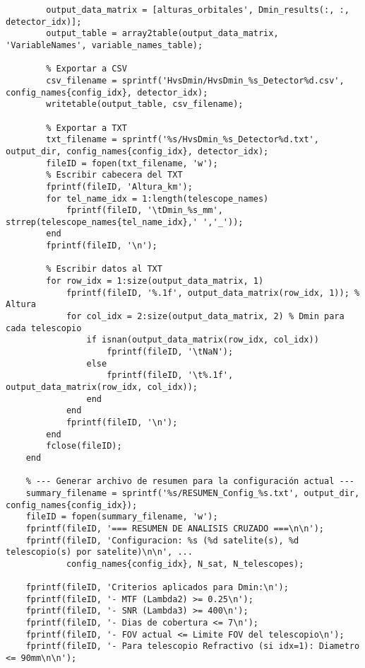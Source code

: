 \begin{verbatim}
        output_data_matrix = [alturas_orbitales', Dmin_results(:, :, detector_idx)];
        output_table = array2table(output_data_matrix, 'VariableNames', variable_names_table);

        % Exportar a CSV
        csv_filename = sprintf('HvsDmin/HvsDmin_%s_Detector%d.csv', config_names{config_idx}, detector_idx);
        writetable(output_table, csv_filename);

        % Exportar a TXT
        txt_filename = sprintf('%s/HvsDmin_%s_Detector%d.txt', output_dir, config_names{config_idx}, detector_idx);
        fileID = fopen(txt_filename, 'w');
        % Escribir cabecera del TXT
        fprintf(fileID, 'Altura_km');
        for tel_name_idx = 1:length(telescope_names)
            fprintf(fileID, '\tDmin_%s_mm', strrep(telescope_names{tel_name_idx},' ','_'));
        end
        fprintf(fileID, '\n');
        
        % Escribir datos al TXT
        for row_idx = 1:size(output_data_matrix, 1)
            fprintf(fileID, '%.1f', output_data_matrix(row_idx, 1)); % Altura
            for col_idx = 2:size(output_data_matrix, 2) % Dmin para cada telescopio
                if isnan(output_data_matrix(row_idx, col_idx))
                    fprintf(fileID, '\tNaN');
                else
                    fprintf(fileID, '\t%.1f', output_data_matrix(row_idx, col_idx));
                end
            end
            fprintf(fileID, '\n');
        end
        fclose(fileID);
    end

    % --- Generar archivo de resumen para la configuración actual ---
    summary_filename = sprintf('%s/RESUMEN_Config_%s.txt', output_dir, config_names{config_idx});
    fileID = fopen(summary_filename, 'w');
    fprintf(fileID, '=== RESUMEN DE ANALISIS CRUZADO ===\n\n');
    fprintf(fileID, 'Configuracion: %s (%d satelite(s), %d telescopio(s) por satelite)\n\n', ...
            config_names{config_idx}, N_sat, N_telescopes);

    fprintf(fileID, 'Criterios aplicados para Dmin:\n');
    fprintf(fileID, '- MTF (Lambda2) >= 0.25\n');
    fprintf(fileID, '- SNR (Lambda3) >= 400\n');
    fprintf(fileID, '- Dias de cobertura <= 7\n');
    fprintf(fileID, '- FOV actual <= Limite FOV del telescopio\n');
    fprintf(fileID, '- Para telescopio Refractivo (si idx=1): Diametro <= 90mm\n\n');


\end{verbatim}
